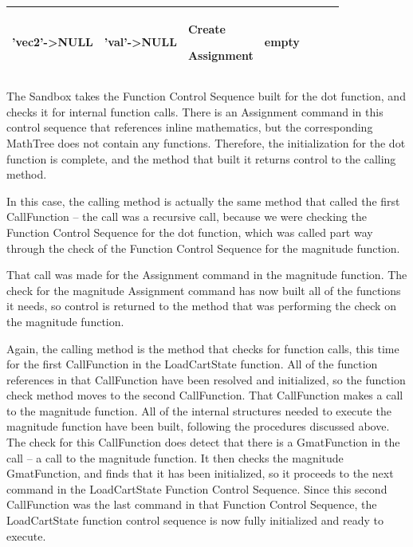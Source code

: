 \begin{center}
\begin{supertabular}{|p{0.9in}|p{0.65in}|p{0.62in}|p{0.83in}|p{0.75in}|p{0.8in}|p{0.7in}|}
\begin{small}
'vec2'->NULL
\end{small} &
\begin{small}
'val'->NULL
\end{small} &
\begin{small}
Create

Assignment
\end{small} &
\begin{small}empty\end{small}\\
\hline
\end{supertabular}
\end{center}

The Sandbox takes the Function Control Sequence built for the dot function,
and checks it for internal function calls.  There is an Assignment command
in this control sequence that references inline mathematics, but the
corresponding MathTree does not contain any functions. Therefore, the
initialization for the dot function is complete, and the method that built
it returns control to the calling method.

In this case, the calling method is actually the same method that called
the first CallFunction -- the call was a recursive call, because we were
checking the Function Control Sequence for the dot function, which was
called part way through the check of the Function Control Sequence for the
magnitude function.

That call was made for the Assignment command in the magnitude function.
The check for the magnitude Assignment command has now built all of the
functions it needs, so control is returned to the method that was
performing the check on the magnitude function.

Again, the calling method is the method that checks for function calls,
this time for the first CallFunction in the LoadCartState function. 
All of the function references in that CallFunction have been resolved
and initialized, so the function check method moves to the second
CallFunction.  That CallFunction makes a call to the magnitude
function.  All of the internal structures needed to execute the
magnitude function have been built, following the procedures discussed
above.  The check for this CallFunction does detect that there is a
GmatFunction in the call -- a call to the magnitude function.  It then
checks the magnitude GmatFunction, and finds that it has been
initialized, so it proceeds to the next command in the LoadCartState
Function Control Sequence.  Since this second CallFunction was the last
command in that Function Control Sequence, the LoadCartState function
control sequence is now fully initialized and ready to execute.

